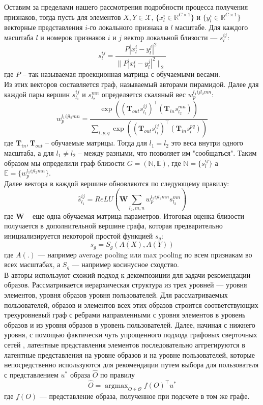 \documentclass[a4paper,14pt]{extarticle}
\DeclareMathOperator*{\argmax}{argmax}
\begin{document}
				Оставим за пределами нашего рассмотрения подробности процесса получения признаков, тогда пусть для элементов $X, Y\in \mathcal{X}$,  $\{x_l^i \in \mathbb{R}^{C\times 1}\}$ и $\{y_l^i \in \mathbb{R}^{C\times 1}\}$ векторные представления $i$-го локального признака в $l$ масштабе. Для каждого масштаба $l$ и номеров признаков $i$ и $j$ вектор локальной близости --- $s_l^{ij}$:
				$$s_l^{ij} = \frac{P|x_l^i-y_l^j|^2}{\|P|x_l^i-y_l^j|^2\|_2}$$
				где $P$ -- так называемая проекционная матрица с обучаемыми весами.\\
				Из этих векторов составляется граф, называемый авторами пирамидой. Далее для каждой пары вершин $s_{l_1}^{ij}$ и $s_{l_2}^{mn}$ определяется скаляный вес $w_p^{l_1ijl_2mn}$:
				$$w_p^{l_1ijl_2mn} = \frac{\exp((\mathbf{T}_{out}s_{l_1}^{ij})^\intercal(\mathbf{T}_{in}s_{l_2}^{mn}))}{\sum\limits_{l,p,q}\exp((\mathbf{T}_{out}s_{l_1}^{ij})^\intercal(\mathbf{T}_{in}s_{l}^{pq}))}$$ 
				где $\mathbf{T}_{in}, \mathbf{T}_{out}$ -- обучаемые матрицы.
				Тогда для $l_1=l_2$ это веса внутри одного масштаба, а для $l_1\neq l_2$ -- между разными, что позволяет им "сообщаться". Таким образом мы определили граф близости $G = (\mathbb{N},\mathbb{E})$, где $\mathbb{N} = \{s_l^{ij}\}$ а $\mathbb{E} = \{w_p^{l_1ijl_2mn}\}$.\\
				Далее вектора в каждой вершине обновляются по следующему правилу:
				$$\widehat{s}_{l_1}^{ij} =ReLU\left(\mathbf{W} \sum\limits_{l_2,m,n}w_p^{l_1ijl_2mn}s_{l_2}^{mn}\right)$$
				где $\mathbf{W}$ -- еще одна обучаемая матрица параметров. Итоговая оценка близости получается в дополнительной вершине графа, которая предварительно инициализируется некоторой простой функцией $s_g$:
				$$s_g = S_g(A(X), A(Y))$$
				где $A(.)$ --- например average pooling или max pooling по всем признакам во всех масштабах, а $S_g$ ---  например косинусное сходство.\\
				
				В \cite{https://doi.org/10.48550/arXiv.2005.12566} авторы используют схожий подход к декомпозиции для задачи рекомендации образов. Рассматривается иерархическая структура из трех уровней --- уровня элементов, уровня образов уровня пользователей. Для рассматриваемых пользователей, образов и элементов всех этих образов строится соответствующих трехуровневый граф с ребрами направленными с уровня элементов в уровень образов и из уровня образов в уровень пользователей. Далее, начиная с нижнего уровня, с помощью фактически чуть упрощенного подхода графовых сверточных сетей \cite{https://doi.org/10.48550/arXiv.1609.02907}, латентные представления элементов последовательно аггрегируются в латентные представления на уровне образов и на уровне пользователей, которые непосредственно используются для рекомендации путем выбора для пользователя с представлением $u^*$ образа $\hat{O}$ по правилу $$\hat{O} = \argmax_{O\in \mathcal{O}}f(O)^\intercal u^*$$
				где $f(O)$ --- представление образа, полученное при подсчете в том же графе.
				
\end{document}
